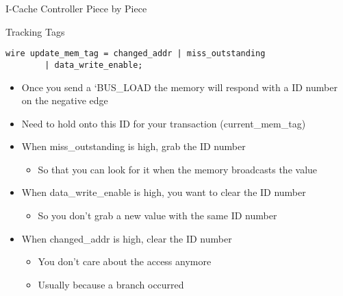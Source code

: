\documentclass[table,dvipsnames]{beamer}
\begin{document}
\begin{frame}[fragile]{I-Cache Controller Piece by Piece}
	\begin{block}{Tracking Tags}
		\begin{verbatim}
wire update_mem_tag = changed_addr | miss_outstanding 
		| data_write_enable;
	\end{verbatim}
	\begin{itemize}
		\item Once you send a `BUS\_LOAD the memory will respond with a ID number on the negative edge
		\item Need to hold onto this ID for your transaction (current\_mem\_tag) 
		\item When miss\_outstanding is high, grab the ID number 
		\begin{itemize} \item So that you can look for it when the memory broadcasts the value \end{itemize}
		\item When data\_write\_enable is high, you want to clear the ID number
		\begin{itemize} \item So you don't grab a new value with the same ID number \end{itemize}
		\item When changed\_addr is high, clear the ID number
		\begin{itemize} 
			\item You don't care about the access anymore
			\item Usually because a branch occurred 
		\end{itemize}
		
	\end{itemize}

	\end{block}	
\end{frame}
\end{document}
